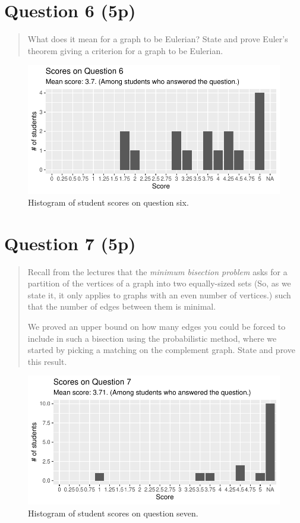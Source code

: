\documentclass[nobib]{tufte-handout}
\begin{document}
\section{Question 6 (5p)} %

\begin{quotation}
  What does it mean for a graph to be Eulerian? State and prove Euler's theorem giving a criterion for a graph to be Eulerian.
\end{quotation}

\begin{figure}[p]
  \centering
  \includegraphics[width = \textwidth]{Q6.pdf}
  \caption[Score histogram for Q6]{Histogram of student scores on question six.}
  \label{fig:Q6}
\end{figure}

\section{Question 7 (5p)} %

\begin{quotation}
  Recall from the lectures that the \emph{minimum bisection problem} asks for a partition of the vertices of a graph into two equally-sized sets (So, as we state it, it only applies to graphs with an even number of vertices.) such that the number of edges between them is minimal.

  We proved an upper bound on how many edges you could be forced to include in such a bisection using the probabilistic method, where we started by picking a matching on the complement graph. State and prove this result.
\end{quotation}

\begin{figure}[p]
  \centering
  \includegraphics[width = \textwidth]{Q7.pdf}
  \caption[Score histogram for Q7]{Histogram of student scores on question seven.}
  \label{fig:Q7}
\end{figure}
\end{document}
